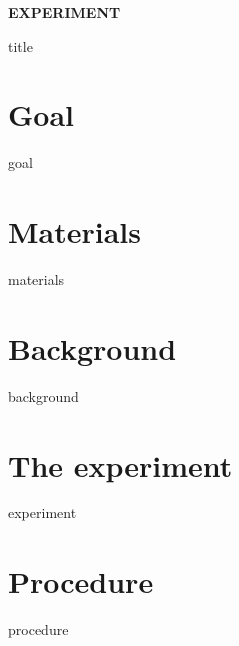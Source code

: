 \documentclass[cover.tex]{subfiles}
\newcommand\chapterlabel{../Ch-kinetics/LAB-clockreaction}
\begin{document}
 \begin{refsection}


\hfill\vspace{0.2cm}\begin{center}{\large \bfseries EXPERIMENT {\thesection}\par\Huge
 {title}
 \\[5pt] \par}\vspace{0.2cm}\end{center}\par\noindent
 
 
\section*{Goal}
 {goal}
\section*{Materials}
 {materials}
\section*{Background}
{background}
\section*{The experiment}
{experiment}


\printbibliography[heading=subbibliography]
\section*{Procedure}
{procedure}
   \clearpage\mbox{}\clearpage







\end{refsection}
\end{document}
